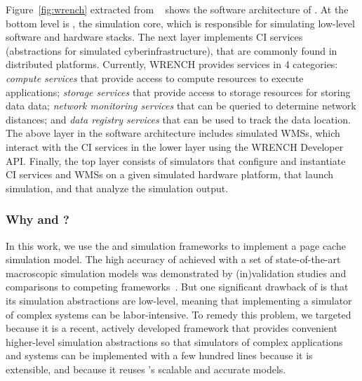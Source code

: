 Figure~\ref{fig:wrench} extracted from ~\cite{casanova2018wrench} 
shows the software architecture of \wrench. 
At the bottom level is \simgrid, the simulation core, which is responsible for 
simulating low-level software and hardware stacks.
The next layer implements CI services (abstractions for simulated 
cyberinfrastructure), that are commonly found in distributed platforms.
Currently, WRENCH provides services in 4 categories: 
\textit{compute services} that provide access to compute resources to 
execute applications; 
\textit{storage services} that provide access to storage resources for 
storing data data; 
\textit{network monitoring services} that can be queried to
determine network distances; and 
\textit{data registry services} that can be used to track the data location.
The above layer in the software architecture includes simulated WMSs, 
which interact with the CI services in the lower layer using the WRENCH 
Developer API.
Finally, the top layer consists of simulators that configure and instantiate 
CI services and WMSs on a given simulated hardware platform, that launch
simulation, and that analyze the simulation output.

\subsubsection{Why \simgrid and \wrench?}

In this work, we use the \simgrid and \wrench simulation
frameworks to implement a page cache simulation model.  
The high accuracy of \simgrid achieved with a set of state-of-the-art 
macroscopic simulation models was demonstrated by (in)validation studies 
and comparisons to competing frameworks~\cite{smpi_validity, 
velhoTOMACS2013, simutool_09, nstools_07, lebre2015, 
pouilloux:hal-01197274, smpi_tpds2017,  7885814, 8048921, 7384330}.  
But one significant drawback of \simgrid is that its simulation
abstractions are low-level, meaning that implementing a
simulator of complex systems can be labor-intensive. 
To remedy this problem, we targeted \wrench because it is a recent,
actively developed framework that provides convenient higher-level 
simulation abstractions so that simulators of complex applications and
systems can be implemented with a few hundred lines because it is extensible, 
and because it reuses \simgrid's scalable and accurate models.
